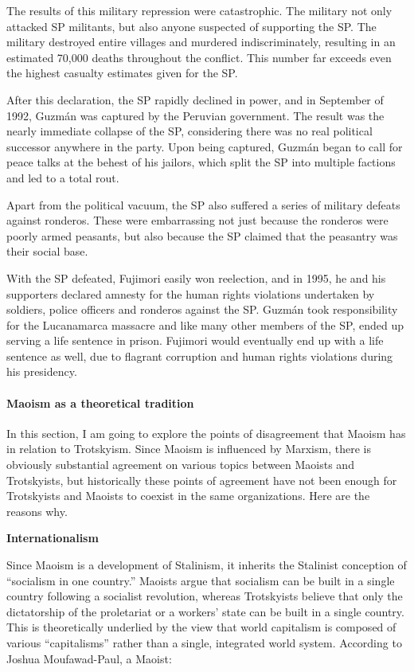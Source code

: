 The results of this military repression were catastrophic. The military not only attacked SP militants, but also anyone suspected of supporting the SP. The military destroyed entire villages and murdered indiscriminately, resulting in an estimated 70,000 deaths throughout the conflict. This number far exceeds even the highest casualty estimates given for the SP.

After this declaration, the SP rapidly declined in power, and in September of 1992, Guzm\'{a}n was captured by the Peruvian government. The result was the nearly immediate collapse of the SP, considering there was no real political successor anywhere in the party. Upon being captured, Guzm\'{a}n began to call for peace talks at the behest of his jailors, which split the SP into multiple factions and led to a total rout.

Apart from the political vacuum, the SP also suffered a series of military defeats against ronderos. These were embarrassing not just because the ronderos were poorly armed peasants, but also because the SP claimed that the peasantry was their social base.

With the SP defeated, Fujimori easily won reelection, and in 1995, he and his supporters declared amnesty for the human rights violations undertaken by soldiers, police officers and ronderos against the SP. Guzm\'{a}n took responsibility for the Lucanamarca massacre and like many other members of the SP, ended up serving a life sentence in prison. Fujimori would eventually end up with a life sentence as well, due to flagrant corruption and human rights violations during his presidency.

\paragraph{Maoism as a theoretical tradition}

In this section, I am going to explore the points of disagreement that Maoism has in relation to Trotskyism. Since Maoism is influenced by Marxism, there is obviously substantial agreement on various topics between Maoists and Trotskyists, but historically these points of agreement have not been enough for Trotskyists and Maoists to coexist in the same organizations. Here are the reasons why.

\textbf{Internationalism}

Since Maoism is a development of Stalinism, it inherits the Stalinist conception of ``socialism in one country.'' Maoists argue that socialism can be built in a single country following a socialist revolution, whereas Trotskyists believe that only the dictatorship of the proletariat or a workers' state can be built in a single country. This is theoretically underlied by the view that world capitalism is composed of various ``capitalisms'' rather than a single, integrated world system. According to Joshua Moufawad-Paul, a Maoist:

